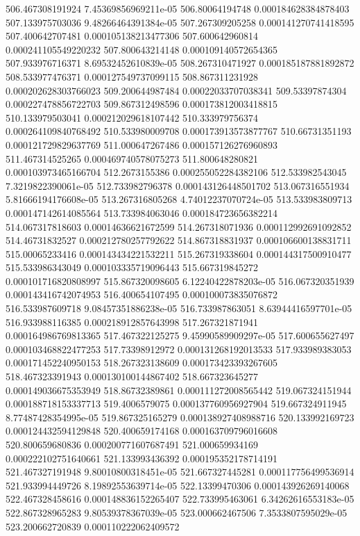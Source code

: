 {506.467308191924 7.45369856969211e-05
506.80064194748 0.000184628384878403
507.133975703036 9.48266464391384e-05
507.267309205258 0.000141270741418595
507.400642707481 0.000105138213477306
507.600642960814 0.000241105549220232
507.800643214148 0.000109140572654365
507.933976716371 8.69532452610839e-05
508.267310471927 0.000185187881892872
508.533977476371 0.000127549737099115
508.867311231928 0.000202628303766023
509.200644987484 0.00022033707038341
509.53397874304 0.000227478856722703
509.867312498596 0.000173812003418815
510.133979503041 0.000212029618107442
510.333979756374 0.000264109840768492
510.533980009708 0.000173913573877767
510.66731351193 0.000121729829637769
511.000647267486 0.000157126276960893
511.467314525265 0.000469740578075273
511.800648280821 0.000103973465166704
512.2673155386 0.000255052284382106
512.533982543045 7.3219822390061e-05
512.733982796378 0.000143126448501702
513.067316551934 5.81666194176608e-05
513.267316805268 4.74012237070724e-05
513.533983809713 0.000147142614085564
513.733984063046 0.000184723656382214
514.067317818603 0.00014636621672599
514.267318071936 0.000112992691092852
514.46731832527 0.000212780257792622
514.867318831937 0.000106600138831711
515.00065233416 0.000143434221532211
515.267319338604 0.000144317500910477
515.533986343049 0.000103335719096443
515.667319845272 0.000101716820808997
515.867320098605 6.12240422878203e-05
516.067320351939 0.000143416742074953
516.400654107495 0.000100073835076872
516.533987609718 9.08457351886238e-05
516.733987863051 8.63944416597701e-05
516.933988116385 0.000218912857643998
517.267321871941 0.000164986769813365
517.467322125275 9.45990589909297e-05
517.600655627497 0.000103468822477253
517.73398912972 0.000131268192013533
517.933989383053 0.000171452240950153
518.267323138609 0.000173423393267605
518.467323391943 0.000130100144867402
518.667323645277 0.000149036675353949
518.86732389861 0.000111272008565442
519.067324151944 0.000188718153337713
519.4006579075 0.000137760956927904
519.667324911945 8.77487428354995e-05
519.867325165279 0.000138927408988716
520.133992169723 0.000124432594129848
520.400659174168 0.000163709796016608
520.800659680836 0.000200771607687491
521.000659934169 0.000222102751640661
521.133993436392 0.000195352178714191
521.467327191948 9.80010800318451e-05
521.667327445281 0.000117756499536914
521.933994449726 8.19892553639714e-05
522.13399470306 0.000143926269140068
522.467328458616 0.000148836152265407
522.733995463061 6.34262616553183e-05
522.867328965283 9.80539378367039e-05
523.000662467506 7.3533807595029e-05
523.200662720839 0.000110222062409572
}
